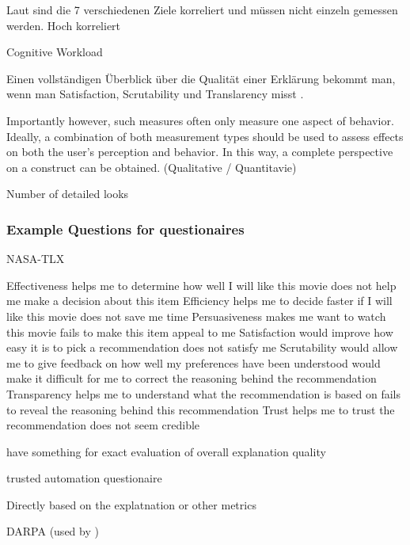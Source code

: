 Laut \cite{balog_measuring_2020} sind die 7 verschiedenen Ziele korreliert und müssen nicht einzeln gemessen werden. Hoch korreliert \cite{kouki_user_2017}

Cognitive Workload \cite{wiegand2019drive, wiegand_id_2020}

Einen vollständigen Überblick über die Qualität einer Erklärung bekommt man, wenn man Satisfaction, Scrutability und Translarency misst \cite{balog_measuring_2020}.

\glqq Importantly however, such measures often only measure one aspect of behavior. Ideally, a combination of both measurement types should be used to assess effects on both the user’s perception and behavior. In this way, a complete perspective on a construct can be obtained.\grqq{} (Qualitative / Quantitavie) \cite{waa_evaluating_2021}

Number of detailed looks

\subsubsection{Example Questions for questionaires}

NASA-TLX \cite{tsai_evaluating_2019}

Effectiveness helps me to determine how well I will like this movie does not help me make a decision about this item Efficiency helps me to decide faster if I will like this movie does not save me time Persuasiveness makes me want to watch this movie fails to make this item appeal to me Satisfaction would improve how easy it is to pick a recommendation does not satisfy me Scrutability would allow me to give feedback on how well my preferences have been understood would make it difficult for me to correct the reasoning behind the recommendation Transparency helps me to understand what the recommendation is based on fails to reveal the reasoning behind this recommendation Trust helps me to trust the recommendation does not seem credible \cite{balog_measuring_2020}

\cite{knijnenburg2012explaining, hernandez-bocanegra_effects_2020} have something for exact evaluation of overall explanation quality

\cite{weitz_you_2019} trusted automation questionaire

Directly based on the explatnation \cite{sato_action-triggering_2019} or other metrics 

DARPA (used by \cite{martin_evaluating_2021}) \cite{gunning2019darpa}


